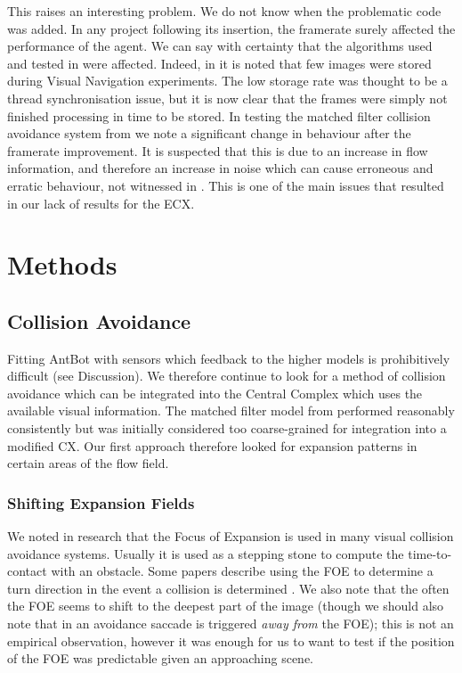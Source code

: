 \documentclass[a4paper,11pt,twoside,openright]{article}
\let\oldsection\section
\def\section{\cleardoublepage\oldsection}
\begin{document}
This raises an interesting problem. We do not know when the
problematic code was added.  In any project following its insertion,
the framerate surely affected the performance of the agent. We can say
with certainty that the algorithms used and tested in \cite{Mitchell2018}
were affected. Indeed, in \cite{Mitchell2018} it is noted that few
images were stored during Visual Navigation experiments. The low
storage rate was thought to be a thread synchronisation issue, but it
is now clear that the frames were simply not finished processing in
time to be stored.  In testing the matched filter collision avoidance
system from \cite{Mitchell2018} we note a significant change in
behaviour after the framerate improvement. It is suspected that this
is due to an increase in flow information, and therefore an increase
in noise which can cause erroneous and erratic behaviour, not
witnessed in \cite{Mitchell2018}.  This is one of the main issues that
resulted in our lack of results for the ECX.
\newpage

\section{ Methods } \label{sec:methods}
\subsection{ Collision Avoidance }
Fitting AntBot with sensors which feedback to the higher models is
prohibitively difficult (see Discussion). We therefore continue to
look for a method of collision avoidance which can be integrated into
the Central Complex which uses the available visual information. The
matched filter model from \cite{Mitchell2018} performed reasonably
consistently but was initially considered too coarse-grained for
integration into a modified CX. Our first approach therefore looked
for expansion patterns in certain areas of the flow field.

\subsubsection{ Shifting Expansion Fields }
We noted in research that the Focus of Expansion is used in many visual collision
avoidance systems. Usually it is used as a stepping stone to compute the
time-to-contact with an obstacle. Some papers describe using the FOE to determine
a turn direction in the event a collision is determined \cite{Stewart2010,
  Vanderstap2012}. We also note that the often the FOE seems to shift to the
deepest part of the image \cite{Vanderstap2012, Souhila2007} (though we should
also note that in \cite{Stewart2010} an avoidance saccade is triggered
\textit{away from} the FOE); this is not an empirical observation,
however it was enough for us to want to test if the position of the
FOE was predictable given an approaching scene.
\newline
\par
\end{document}
